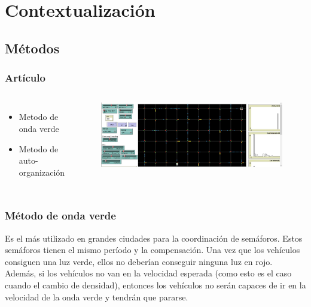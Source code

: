 \documentclass{beamer}
\begin{document}
%
\section{Contextualización} 
\subsection{Métodos}
%
\begin{frame}
\frametitle{Artículo}

 \begin{columns}[c] %
% 	
 	\begin{itemize}
 		\item Metodo de onda verde
 		\item Metodo de auto-organización
 	\end{itemize}
 	\begin{figure}
 		\label{[fig01]}
 		\includegraphics[scale=0.2]{net.JPG}
 	\end{figure}

 \end{columns}



\end{frame}
%
%

\begin{frame}
\frametitle{Método de onda verde}
Es el más utilizado en grandes ciudades para la coordinación de semáforos. Estos semáforos tienen el mismo período y la compensación. Una vez que los vehículos consiguen una luz verde, ellos no deberían conseguir ninguna luz en rojo.\\
Además, si los vehículos no van en la velocidad esperada (como esto es el caso cuando el cambio de densidad), entonces los vehículos no serán capaces de ir en la velocidad de la onda verde y tendrán que pararse.


%
\end{frame}
%
%
\end{document}
